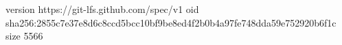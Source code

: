 version https://git-lfs.github.com/spec/v1
oid sha256:2855c7e37e8d6c8ccd5bcc10bf9be8ed4f2b0b4a97fe748dda59e752920b6f1c
size 5566
